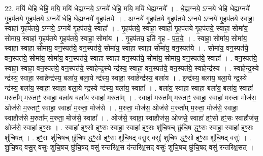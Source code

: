 \documentclass[17pt]{extarticle}
\begin{document}
22. मयि॑ धेहि धेहि॒ मयि॒ मयि॑ धेह्य॒ग्नये॒ ऽग्नये॑ धेहि॒ मयि॒ मयि॑ धेह्य॒ग्नये᳚ । . धे॒ह्य॒ग्नये॒ ऽग्नये॑ धेहि धेह्य॒ग्नये॑ गृ॒हप॑तये गृ॒हप॑तये॒ ऽग्नये॑ धेहि धेह्य॒ग्नये॑ गृ॒हप॑तये । . अ॒ग्नये॑ गृ॒हप॑तये गृ॒हप॑तये॒ ऽग्नये॒ ऽग्नये॑ गृ॒हप॑तये॒ स्वाहा॒ स्वाहा॑ गृ॒हप॑तये॒ ऽग्नये॒ ऽग्नये॑ गृ॒हप॑तये॒ स्वाहा᳚ । . गृ॒हप॑तये॒ स्वाहा॒ स्वाहा॑ गृ॒हप॑तये गृ॒हप॑तये॒ स्वाहा॒ सोमा॑य॒ सोमा॑य॒ स्वाहा॑ गृ॒हप॑तये गृ॒हप॑तये॒ स्वाहा॒ सोमा॑य । . गृ॒हप॑तय॒ इति॑ गृ॒ह - प॒त॒ये॒ । . स्वाहा॒ सोमा॑य॒ सोमा॑य॒ स्वाहा॒ स्वाहा॒ सोमा॑य॒ वन॒स्पत॑ये॒ वन॒स्पत॑ये॒ सोमा॑य॒ स्वाहा॒ स्वाहा॒ सोमा॑य॒ वन॒स्पत॑ये । . सोमा॑य॒ वन॒स्पत॑ये॒ वन॒स्पत॑ये॒ सोमा॑य॒ सोमा॑य॒ वन॒स्पत॑ये॒ स्वाहा॒ स्वाहा॒ वन॒स्पत॑ये॒ सोमा॑य॒ सोमा॑य॒ वन॒स्पत॑ये॒ स्वाहा᳚ । . वन॒स्पत॑ये॒ स्वाहा॒ स्वाहा॒ वन॒स्पत॑ये॒ वन॒स्पत॑ये॒ स्वाहेन्द्र॒स्ये न्द्र॑स्य॒ स्वाहा॒ वन॒स्पत॑ये॒ वन॒स्पत॑ये॒ स्वाहेन्द्र॑स्य । . स्वाहेन्द्र॒स्ये न्द्र॑स्य॒ स्वाहा॒ स्वाहेन्द्र॑स्य॒ बला॑य॒ बला॒ये न्द्र॑स्य॒ स्वाहा॒ स्वाहेन्द्र॑स्य॒ बला॑य । . इन्द्र॑स्य॒ बला॑य॒ बला॒ये न्द्र॒स्ये न्द्र॑स्य॒ बला॑य॒ स्वाहा॒ स्वाहा॒ बला॒ये न्द्र॒स्ये न्द्र॑स्य॒ बला॑य॒ स्वाहा᳚ । . बला॑य॒ स्वाहा॒ स्वाहा॒ बला॑य॒ बला॑य॒ स्वाहा॑ म॒रुता᳚म् म॒रुताꣳ॒॒ स्वाहा॒ बला॑य॒ बला॑य॒ स्वाहा॑ म॒रुता᳚म् । . स्वाहा॑ म॒रुता᳚म् म॒रुताꣳ॒॒ स्वाहा॒ स्वाहा॑ म॒रुता॒ मोज॑स॒ ओज॑से म॒रुताꣳ॒॒ स्वाहा॒ स्वाहा॑ म॒रुता॒ मोज॑से । . म॒रुता॒ मोज॑स॒ ओज॑से म॒रुता᳚म् म॒रुता॒ मोज॑से॒ स्वाहा॒ स्वाहौज॑से म॒रुता᳚म् म॒रुता॒ मोज॑से॒ स्वाहा᳚ । . ओज॑से॒ स्वाहा॒ स्वाहौज॑स॒ ओज॑से॒ स्वाहा॑ हꣳ॒॒सो हꣳ॒॒सः स्वाहौज॑स॒ ओज॑से॒ स्वाहा॑ हꣳ॒॒सः । . स्वाहा॑ हꣳ॒॒सो हꣳ॒॒सः स्वाहा॒ स्वाहा॑ हꣳ॒॒सः शु॑चि॒षच् छु॑चि॒ष द्धꣳ॒॒सः स्वाहा॒ स्वाहा॑ हꣳ॒॒सः शु॑चि॒षत् । . हꣳ॒॒सः शु॑चि॒षच् छु॑चि॒ष द्धꣳ॒॒सो हꣳ॒॒सः शु॑चि॒षद् वसु॒र् वसुः॑ शुचि॒ष द्धꣳ॒॒सो हꣳ॒॒सः शु॑चि॒षद् वसुः॑ । . शु॒चि॒षद् वसु॒र् वसुः॑ शुचि॒षच् छु॑चि॒षद् वसु॑ रन्तरिक्ष॒स द॑न्तरिक्ष॒सद् वसुः॑ शुचि॒षच् छु॑चि॒षद् वसु॑ रन्तरिक्ष॒सत् । \newline
\end{document}
